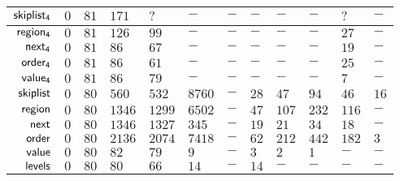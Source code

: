 {\begin{tabular}{ |r||T|T|T||T|T|T|T|T|T|T|T||}
		$\mathsf{skiplist_{4}}$  & $0$ & $81$ &$171$ & $?$  &  $-$ & $-$ &  $-$ &  $-$  &  $-$  & $?$ & $-$ \\ \hline
		$\mathsf{region_{4}}$	  & $0$ & $81$ &$126$ & $99$ &  $-$ & $-$ &  $-$ &  $-$  &  $-$  &$27$ & $-$ \\ \hline
		$\mathsf{next_{4}}$		  & $0$ & $81$ &$ 86$ & $67$ &  $-$ & $-$ &  $-$ &  $-$  &  $-$  &$19$ & $-$ \\ \hline
		$\mathsf{order_{4}}$		  & $0$ & $81$ &$ 86$ & $61$ &  $-$ & $-$ &  $-$ &  $-$  &  $-$  &$25$ & $-$ \\ \hline
		$\mathsf{value_{4}}$		  & $0$ & $81$ &$ 86$ & $79$ &  $-$ & $-$ &  $-$ &  $-$  &  $-$  & $7$ & $-$ \\ \hline \hline
		$\mathsf{skiplist}$			& $0$ & $80$ &$560$ &$532$ &$8760$& $-$ & $28$ & $47$  &  $94$ &$46$ &$16$ \\ \hline
		$\mathsf{region}$			& $0$ & $80$ &$1346$&$1299$&$6502$& $-$ & $47$ & $107$ & $232$ &$116$& $-$ \\ \hline
		$\mathsf{next}$				& $0$ & $80$ &$1346$&$1327$& $345$& $-$ & $19$ &  $21$ &  $34$ & $18$& $-$ \\ \hline
		$\mathsf{order}$				& $0$ & $80$ &$2136$&$2074$&$7418$& $-$ & $62$ & $212$ & $442$ &$182$& $3$ \\ \hline
		$\mathsf{value}$				& $0$ & $80$ & $82$ & $79$ &  $9$ & $-$ &  $3$ &   $2$ &   $1$ & $-$ & $-$ \\ \hline
		$\mathsf{levels}$			& $0$ & $80$ & $80$ & $66$ & $14$ & $-$ & $14$ &   $-$ &   $-$ & $-$ & $-$ \\ \hline
	\end{tabular}
}


